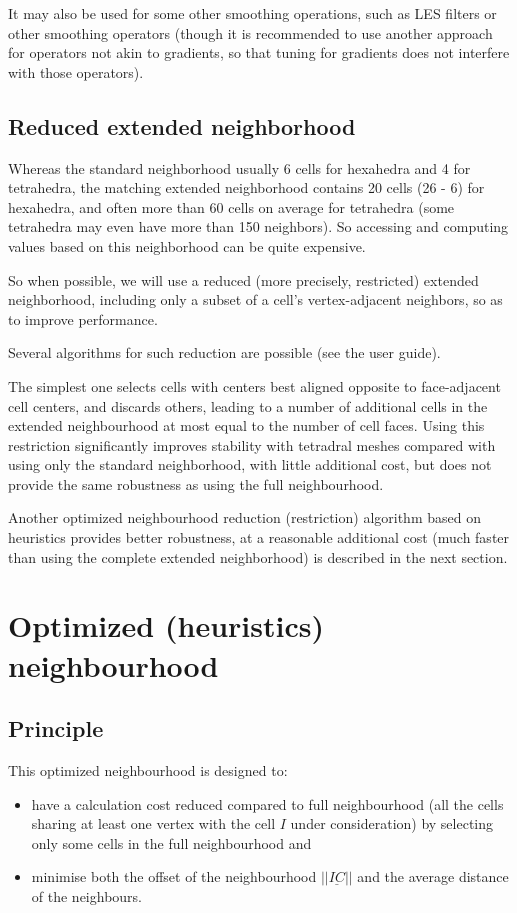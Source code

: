 It may also be used for some other smoothing operations, such as LES filters
or other smoothing operators (though it is recommended to use another approach
for operators not akin to gradients, so that tuning for gradients does not
interfere with those operators).

\subsection{Reduced extended neighborhood}

Whereas the standard neighborhood usually 6 cells for hexahedra and
4 for tetrahedra, the matching extended neighborhood contains 20 cells
(26 - 6) for hexahedra, and often more than 60 cells on average for tetrahedra
(some tetrahedra may even have more than 150 neighbors).
So accessing and computing values based on this neighborhood can be quite
expensive.

So when possible, we will use a reduced (more precisely, restricted) extended
neighborhood, including only a subset of a cell's vertex-adjacent neighbors,
so as to improve performance.

Several algorithms for such reduction are possible (see the user guide).

The simplest one selects cells with centers best aligned opposite to face-adjacent
cell centers, and discards others, leading to a number of additional cells in
the extended neighbourhood at most equal to the number of cell faces. Using this
restriction significantly improves stability with tetradral meshes compared with
using only the standard neighborhood, with little additional cost, but does
not provide the same robustness as using the full neighbourhood.

Another optimized neighbourhood reduction (restriction) algorithm based on
heuristics provides better robustness, at a reasonable additional cost
(much faster than using the complete extended neighborhood) is described
in the next section.

\section{Optimized (heuristics) neighbourhood}

\subsection{Principle}

This optimized neighbourhood is designed to:
\begin{itemize}
  \item have a calculation cost
    reduced compared to full neighbourhood (all the cells sharing at least
    one vertex with the cell $I$ under consideration) by selecting only
    some cells in the full neighbourhood and
  \item minimise both the offset of the neighbourhood
    $|| \underline{IC} ||$ and the average distance of the neighbours.
\end{itemize}

